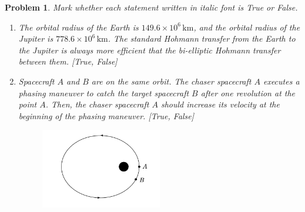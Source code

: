 \documentclass[10pt]{article}
\theoremstyle{plain}\theorembodyfont{\normalfont}
\newtheorem{prob}{Problem}[section]
\renewcommand{\theprob}{\arabic{prob}}
\newenvironment{subprob}%
{\renewcommand{\theenumi}{\alph{enumi}}\renewcommand{\labelenumi}{(\theenumi)}\begin{enumerate}}%
{\end{enumerate}}%
\begin{document}
\renewcommand{\theprob}{\arabic{prob} \textit{(20pt)}}
\begin{prob}
Mark whether each statement written in \textit{italic font} is True or False.%

\begin{subprob}

\item The orbital radius of the Earth is $149.6\times 10^6\,\mathrm{km}$, and the orbital radius of the Jupiter is $778.6\times 10^6\,\mathrm{km}$. \textit{The standard Hohmann transfer from the Earth to the Jupiter is always more efficient that the bi-elliptic Hohmann transfer between them.} [True, False]

\item Spacecraft $A$ and $B$ are on the same orbit. The chaser spacecraft $A$ executes a phasing maneuver to catch the target spacecraft $B$ after one revolution at the point $A$. \textit{Then, the chaser spacecraft $A$ should increase its velocity at the beginning of the phasing maneuver.} [True, False] 

    \begin{figure}[htbp]
        \centering
        \includegraphics[width=0.5\textwidth]{figures/prob1.png}
    \end{figure}

%



\end{subprob}
\end{prob}
\end{document}
